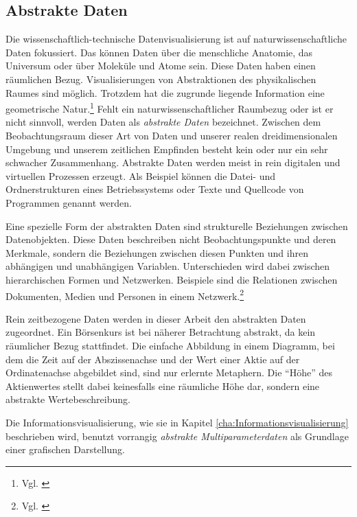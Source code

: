 \documentclass[a4paper, 
               12pt,
               DIV=calc,
               version=first,
               pdftex,
               headsepline,
               footsepline,
               bibtotocnumbered,
               liststotocnumbered]{scrreprt}
\begin{document}
\subsection{Abstrakte Daten}
Die wissenschaftlich-technische Datenvisualisierung ist auf naturwissenschaftliche Daten fokussiert.
Das können Daten über die menschliche Anatomie, das Universum oder über Moleküle und Atome sein. Diese Daten
haben einen räumlichen Bezug. Visualisierungen von Abstraktionen des physikalischen Raumes
sind möglich. Trotzdem hat die zugrunde liegende Information eine geometrische Natur.\footnote{Vgl. \citep[S.\,6]{Card}}
Fehlt ein naturwissenschaftlicher Raumbezug oder ist er nicht sinnvoll, werden Daten als \textit{abstrakte Daten} bezeichnet.
Zwischen dem Beobachtungsraum dieser Art von Daten und unserer realen dreidimensionalen Umgebung und unserem zeitlichen Empfinden
besteht kein oder nur ein sehr schwacher Zusammenhang.
Abstrakte Daten werden meist in rein digitalen und virtuellen Prozessen erzeugt. Als Beispiel
können die Datei- und Ordnerstrukturen eines Betriebssystems oder Texte und Quellcode von Programmen genannt werden.

Eine spezielle Form der abstrakten Daten sind strukturelle Beziehungen zwischen Datenobjekten.
Diese Daten beschreiben nicht Beobachtungspunkte und deren Merkmale, sondern die Beziehungen
zwischen diesen Punkten und ihren abhängigen und unabhängigen Variablen. Unterschieden wird dabei
zwischen hierarchischen Formen und Netzwerken. Beispiele sind die Relationen zwischen Dokumenten,
Medien und Personen in einem Netzwerk.\footnote{Vgl. \citep{Preim}}

Rein zeitbezogene Daten werden in dieser Arbeit den abstrakten Daten zugeordnet. Ein Börsenkurs ist bei näherer Betrachtung
abstrakt, da kein räumlicher Bezug stattfindet.
Die einfache Abbildung in einem Diagramm, bei dem die Zeit auf der Abszissenachse und der Wert einer Aktie auf der Ordinatenachse
abgebildet sind, sind nur erlernte Metaphern. Die "`Höhe"' des Aktienwertes stellt dabei keinesfalls eine räumliche
Höhe dar, sondern eine abstrakte Wertebeschreibung.

Die Informationsvisualisierung, wie sie in Kapitel \ref{cha:Informationsvisualisierung} beschrieben wird, benutzt
vorrangig \textit{abstrakte Multiparameterdaten} als Grundlage einer grafischen Darstellung.
\end{document}
